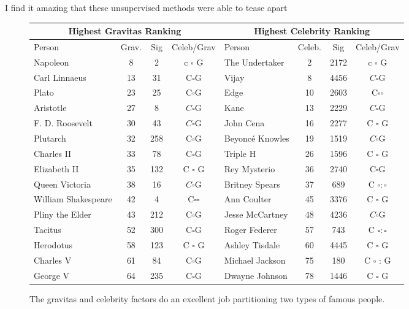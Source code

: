 \documentclass[10pt]{article}
\begin{document}
I find it amazing that these unsupervised methods were able to tease apart

\clearpage
\begin{figure}[H]
\centering
\begin{tabular}{|l|c|c|c||l|c|c|c|}
\hline
\multicolumn{4}{|c||}{Highest Gravitas Ranking} & \multicolumn{4}{c|}{Highest Celebrity Ranking} \\
\hline
Person & Grav. & Sig & Celeb/Grav & Person & Celeb. & Sig & Celeb/Grav \\
\hline
Napoleon & 8 & 2 & c $\square$ G & The Undertaker & 2 & 2172 & c $\square$ G \\
Carl Linnaeus & 13 & 31 & $\mathrm{C} \square \mathrm{G}$ & Vijay & 8 & 4456 & $C \square \mathrm{G}$ \\
Plato & 23 & 25 & $\mathrm{C} \square \mathrm{G}$ & Edge & 10 & 2603 & $\mathrm{C} \square \mathrm{\square}$ \\
Aristotle & 27 & 8 & $C \square \mathrm{G}$ & Kane & 13 & 2229 & $C \square \mathrm{G}$ \\
F. D. Roosevelt & 30 & 43 & $C \square \mathrm{G}$ & John Cena & 16 & 2277 & C $\square$ G \\
Plutarch & 32 & 258 & $\mathrm{C} \square \mathrm{G}$ & Beyoncé Knowles & 19 & 1519 & $C \square \mathrm{G}$ \\
Charles II & 33 & 78 & $\mathrm{C} \square \mathrm{G}$ & Triple H & 26 & 1596 & C $\square$ G \\
Elizabeth II & 35 & 132 & C $\square$ G & Rey Mysterio & 36 & 2740 & $\mathrm{C} \square \mathrm{G}$ \\
Queen Victoria & 38 & 16 & $C \square \mathrm{G}$ & Britney Spears & 37 & 689 & C $\square: \square$ \\
William Shakespeare & 42 & 4 & $\mathrm{C} \square \mathrm{\square}$ & Ann Coulter & 45 & 3376 & C $\square$ G \\
Pliny the Elder & 43 & 212 & $\mathrm{C} \square \mathrm{G}$ & Jesse McCartney & 48 & 4236 & $C \square \mathrm{G}$ \\
Tacitus & 52 & 300 & $\mathrm{C} \square \mathrm{G}$ & Roger Federer & 57 & 743 & C $\square: \square$ \\
Herodotus & 58 & 123 & C $\square$ G & Ashley Tisdale & 60 & 4445 & C $\square$ G \\
Charles V & 61 & 84 & $\mathrm{C} \square \mathrm{G}$ & Michael Jackson & 75 & 180 & C $\square$ : G \\
George V & 64 & 235 & $\mathrm{C} \square \mathrm{G}$ & Dwayne Johnson & 78 & 1446 & C $\square$ G \\
\hline
\end{tabular}
\caption{The gravitas and celebrity factors do an excellent job partitioning two types of famous people.}
\end{figure}
\end{document}
